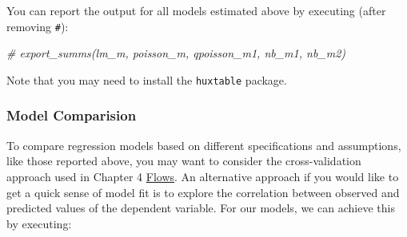 \documentclass[
]{book}
\newenvironment{Shaded}{\begin{snugshade}}{\end{snugshade}}
\newcommand{\CommentTok}[1]{\textcolor[rgb]{0.56,0.35,0.01}{\textit{#1}}}
\begin{document}
You can report the output for all models estimated above by executing (after removing \texttt{\#}):

\begin{Shaded}
\begin{Highlighting}[]
\CommentTok{# export_summs(lm_m, poisson_m, qpoisson_m1, nb_m1, nb_m2)}
\end{Highlighting}
\end{Shaded}

Note that you may need to install the \texttt{huxtable} package.

\hypertarget{model-comparision}{%
\subsubsection{Model Comparision}\label{model-comparision}}

To compare regression models based on different specifications and assumptions, like those reported above, you may want to consider the cross-validation approach used in Chapter 4 \protect\hyperlink{flows}{Flows}. An alternative approach if you would like to get a quick sense of model fit is to explore the correlation between observed and predicted values of the dependent variable. For our models, we can achieve this by executing:
\end{document}
